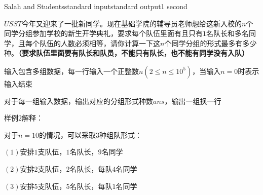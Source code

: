 \begin{problem}{Salah and Students}{standard input}{standard output}{1 second}

$USST$今年又迎来了一批新同学。现在基础学院的辅导员老师想给这新入校的$n$个同学分组参加学校的新生开学典礼，要求每个队伍里面有且只有$1$名队长和多名同学，且每个队伍的人数必须相等，请你计算一下这$n$个同学分组的形式最多有多少种。\textbf{（要求队伍里面要有队长和队员，不能只有队长，也不能有同学没有入队）}

\InputFile

输入包含多组数据，每一行输入一个正整数$n(2\le n\le 10^5)$，当输入$n=0$时表示输入结束

\OutputFile

对于每一组输入数据，输出对应的分组形式种数$ans$，输出一组换一行
	
\Examples

\begin{example}
%
%
\end{example}

样例$2$解释：

对于$n=10$的情况，可以采取$3$种组队形式：

$(1)$安排$1$支队伍，$1$名队长，$9$名同学

$(2)$安排$2$支队伍，$2$名队长，每队$4$名同学

$(3)$安排$5$支队伍，$5$名队长，每队$1$名同学

\end{problem}
